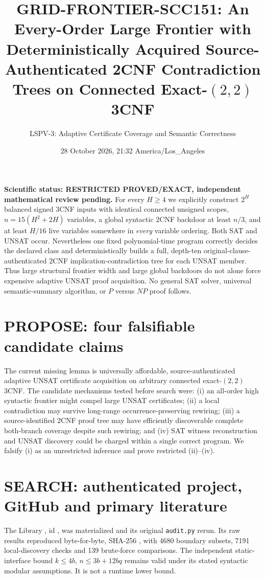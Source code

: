 \documentclass[11pt]{article}
\title{GRID-FRONTIER-SCC151: An Every-Order Large Frontier with Deterministically Acquired Source-Authenticated 2CNF Contradiction Trees on Connected Exact-$(2,2)$ 3CNF}
\author{LSPV-3: Adaptive Certificate Coverage and Semantic Correctness}
\date{28 October 2026, 21:32 America/Los\_Angeles}
\begin{document}
\maketitle
\noindent\textbf{Scientific status: RESTRICTED PROVED/EXACT, independent mathematical review pending.}
For every $H\ge4$ we explicitly construct $2^H$ balanced signed 3CNF inputs with identical connected unsigned scopes, $n=15(H^2+2H)$ variables, a global syntactic 2CNF backdoor at least $n/3$, and at least $H/16$ live variables somewhere in \emph{every} variable ordering. Both SAT and UNSAT occur. Nevertheless one fixed polynomial-time program correctly decides the declared class and deterministically builds a full, depth-ten original-clause-authenticated 2CNF implication-contradiction tree for each UNSAT member. Thus large structural frontier width and large global backdoors do not alone force expensive adaptive UNSAT proof acquisition. No general SAT solver, universal semantic-summary algorithm, or $P$ versus $NP$ proof follows.

\section{PROPOSE: four falsifiable candidate claims}
The current missing lemma is universally affordable, source-authenticated adaptive UNSAT certificate acquisition on arbitrary connected exact-$(2,2)$ 3CNF. The candidate mechanisms tested before search were: (i) an all-order high syntactic frontier might compel large UNSAT certificates; (ii) a local contradiction may survive long-range occurrence-preserving rewiring; (iii) a source-identified 2CNF proof tree may have efficiently discoverable complete both-branch coverage despite such rewiring; and (iv) SAT witness reconstruction and UNSAT discovery could be charged within a single correct program. We falsify (i) as an unrestricted inference and prove restricted (ii)--(iv).

\section{SEARCH: authenticated project, GitHub and primary literature}
The Library , id , was materialized and its original \texttt{audit.py} rerun. Its raw results reproduced byte-for-byte, SHA-256 , with 4680 boundary subsets, 7191 local-discovery checks and 139 brute-force comparisons. The independent static-interface bound $k\le4b$, $n\le3b+12bq$ remains valid under its stated syntactic modular assumptions. It is not a runtime lower bound.
\end{document}
